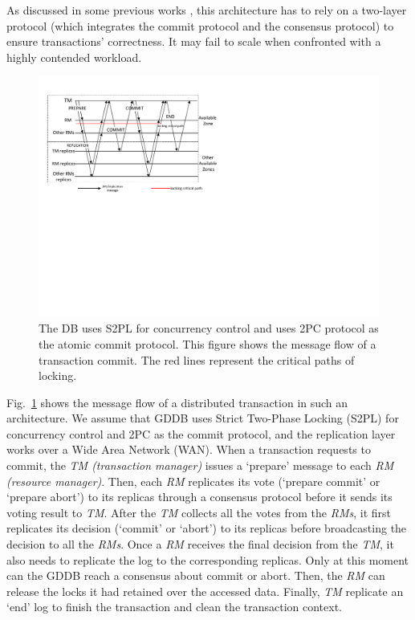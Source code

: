 \documentclass[conference]{IEEEtran}
\begin{document}
As discussed in some previous works \cite{Calvin:conf/sigmod/ThomsonDWRSA12}\cite{Tapir:conf/sosp/ZhangSSKP15}\cite{Janus:conf/osdi/MuNLL16},
this architecture has to rely on a two-layer protocol (which integrates the commit protocol and the consensus protocol) to ensure transactions' correctness.
It may fail to scale when confronted with a highly contended workload.


\begin{figure}[tbp]
  \centerline{\includegraphics[scale=0.50]{message_flow.pdf}}
  \caption
  {
The DB uses S2PL for concurrency control and uses 2PC protocol as the atomic commit protocol.
This figure shows the message flow of a transaction commit.
The red lines represent the critical paths of locking.
    }
\label{fig:message_flow}
\end{figure}

Fig.~\ref{fig:message_flow} shows the message flow of a distributed transaction in such an architecture. We assume that
GDDB uses Strict Two-Phase Locking (S2PL) for concurrency control and 2PC as the commit protocol, and the replication layer works over a Wide Area Network (WAN).
When a transaction requests to commit, the \emph{TM (transaction manager)} issues a `prepare' message to each \emph{RM (resource manager)}.
Then, each \emph{RM} replicates its vote (`prepare commit' or `prepare abort') to its replicas through a consensus protocol before it
sends its voting result to \emph{TM}.
After the \emph{TM} collects all the votes from the \emph{RMs}, it first replicates its decision (`commit' or `abort') to its replicas before broadcasting the decision to all the \emph{RMs}.
Once a \emph{RM} receives the final decision from the \emph{TM}, it also needs to replicate the log to the corresponding replicas.
Only at this moment can the GDDB reach a consensus about commit or abort.
Then, the \emph{RM} can release the locks it had retained over the accessed data.
Finally, \emph{TM} replicate an `end' log to finish the transaction and clean the transaction context.
\end{document}
